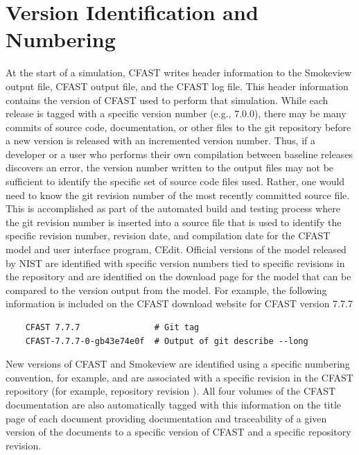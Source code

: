 \documentclass[12pt]{book}
\begin{document}
\section{Version Identification and Numbering}

At the start of a simulation, CFAST writes header information to the Smokeview output file, CFAST output file, and the CFAST log file.  This header information contains the version of CFAST used to perform that simulation. While each release is tagged with a specific version number (e.g., 7.0.0), there may be many commits of source code, documentation, or other files to the git repository before a new version is released with an incremented version number.  Thus, if a developer or a user who performs their own compilation between baseline releases discovers an error, the version number written to the output files may not be sufficient to identify the specific set of source code files used.  Rather, one would need to know the git revision number of the most recently committed source file. This is accomplished as part of the automated build and testing process where the git revision number is inserted into a source file that is used to identify the specific revision number, revision date, and compilation date for the CFAST model and user interface program, CEdit. Official versions of the model released by NIST are identified with specific version numbers tied to specific revisions in the repository and are identified on the download page for the model that can be compared to the version output from the model. For example, the following information is included on the CFAST download website for CFAST version 7.7.7

\begin{lstlisting}
    CFAST 7.7.7               # Git tag
    CFAST-7.7.7-0-gb43e74e0f  # Output of git describe --long
\end{lstlisting}

New versions of CFAST and Smokeview are identified using a specific numbering convention, for example,  and are associated with a specific revision in the CFAST repository (for example, repository revision ). All four volumes of the CFAST documentation are also automatically tagged with this information on the title page of each document providing documentation and traceability of a given version of the documents to a specific version of CFAST and a specific repository revision.
\end{document}
